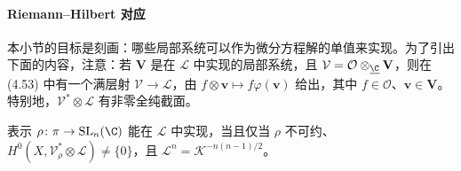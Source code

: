 \paragraph{Riemann–Hilbert 对应}
本小节的目标是刻画：哪些局部系统可以作为微分方程解的单值来实现。为了引出下面的内容，注意：若 $\mathbf{V}$ 是在 $\mathcal{L}$ 中实现的局部系统，且 $\mathcal{V}=\mathcal{O}\otimes_{\underline{\C}}\mathbf{V}$，则在 (4.53) 中有一个满层射 $\mathcal{V}\to\mathcal{L}$，由 $f\otimes\mathbf{v}\mapsto f\varphi(\mathbf{v})$ 给出，其中 $f\in\mathcal{O}$、$\mathbf{v}\in\mathbf{V}$。特别地，$\mathcal{V}^*\otimes\mathcal{L}$ 有非零全纯截面。

\begin{theorem}
表示 $\rho\colon\pi\to\mathrm{SL}_n(\C)$ 能在 $\mathcal{L}$ 中实现，当且仅当 $\rho$ 不可约、$H^0(X,\mathcal{V}^*_\rho\otimes\mathcal{L})\neq\{0\}$，且 $\mathcal{L}^n=\mathcal{K}^{-n(n-1)/2}$。
\end{theorem}

